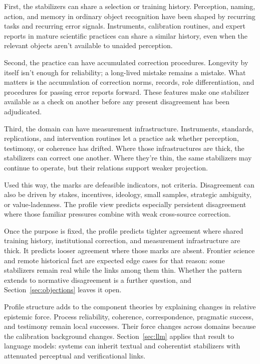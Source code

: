 \documentclass[12pt]{article}
\begin{document}
First, the stabilizers can share a selection or training history. Perception, naming,
action, and memory in ordinary object recognition have been shaped by recurring tasks and
recurring error signals. Instruments, calibration routines, and expert reports in mature
scientific practices can share a similar history, even when the relevant objects aren't
available to unaided perception.

Second, the practice can have accumulated correction procedures. Longevity by itself isn't
enough for reliability; a long-lived mistake remains a mistake. What matters is the
accumulation of correction norms,
records, role differentiation, and procedures for passing error reports forward. These
features make one stabilizer available as a check on another before any present
disagreement has been adjudicated.

Third, the domain can have measurement infrastructure. Instruments, standards,
replications, and intervention routines let a practice ask whether perception, testimony,
or coherence has drifted. Where those infrastructures are thick, the stabilizers can
correct one another. Where they're thin, the same stabilizers may continue to operate,
but their relations support weaker projection.

Used this way, the marks are defeasible indicators, not criteria. Disagreement can also be
driven by stakes, incentives, ideology, small samples, strategic ambiguity, or
value-ladenness. The profile view predicts especially persistent disagreement where those
familiar pressures combine with weak cross-source correction.

Once the purpose is fixed, the profile predicts tighter agreement where shared training
history, institutional correction, and measurement infrastructure are thick. It predicts
looser agreement where those marks are absent. Frontier science and remote historical fact
are expected edge cases for that reason:
some stabilizers remain real while the links among them thin. Whether the pattern extends
to normative disagreement is a further question, and Section~\ref{sec:objections} leaves
it open.

Profile structure adds to the component theories by explaining changes in relative
epistemic force. Process reliability, coherence, correspondence, pragmatic success, and
testimony remain local successes. Their force changes across domains because the
calibration background changes. Section~\ref{sec:llm} applies that result to language
models: systems can inherit textual and coherentist stabilizers with attenuated
perceptual and verificational links.
\end{document}
